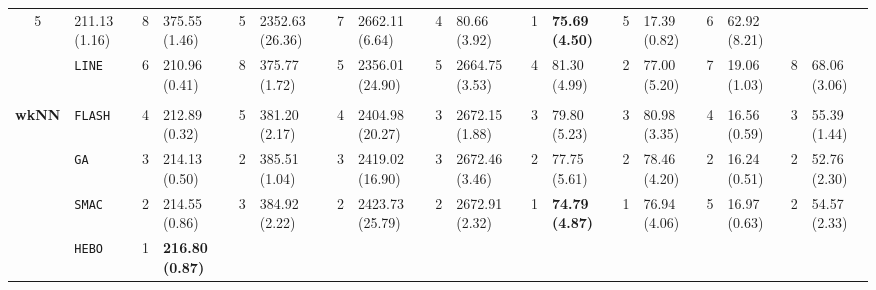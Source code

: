 \begin{tabular}{clllllllllllllllll}
  5 &
  \multicolumn{1}{l|}{211.13 (1.16)} &
  8 &
  \multicolumn{1}{l|}{375.55 (1.46)} &
  5 &
  \multicolumn{1}{l|}{2352.63 (26.36)} &
  7 &
  \multicolumn{1}{l|}{2662.11 (6.64)} &
  4 &
  \multicolumn{1}{l|}{80.66 (3.92)} &
  \cellcolor{blue!15}1 &
  \multicolumn{1}{l|}{\cellcolor{blue!15}\textbf{75.69 (4.50)}} &
  5 &
  \multicolumn{1}{l|}{17.39 (0.82)} &
  6 &
  62.92 (8.21) \\
\multicolumn{1}{c|}{} &
  \multicolumn{1}{l|}{\texttt{LINE}} &
  6 &
  \multicolumn{1}{l|}{210.96 (0.41)} &
  8 &
  \multicolumn{1}{l|}{375.77 (1.72)} &
  5 &
  \multicolumn{1}{l|}{2356.01 (24.90)} &
  5 &
  \multicolumn{1}{l|}{2664.75 (3.53)} &
  4 &
  \multicolumn{1}{l|}{81.30 (4.99)} &
  2 &
  \multicolumn{1}{l|}{77.00 (5.20)} &
  7 &
  \multicolumn{1}{l|}{19.06 (1.03)} &
  8 &
  68.06 (3.06) \\
\hline
\multicolumn{1}{l}{\textbf{}} &
    &
    &
    &
    &
    &
    &
    &
    &
    &
    &
    &
    &
    &
    &
    &
    &
    \\ \hline
\multicolumn{1}{c|}{\multirow{9}{*}{\textbf{wkNN}}} &
  \multicolumn{1}{l|}{\texttt{FLASH}} &
  4 &
  \multicolumn{1}{l|}{212.89 (0.32)} &
  5 &
  \multicolumn{1}{l|}{381.20 (2.17)} &
  4 &
  \multicolumn{1}{l|}{2404.98 (20.27)} &
  3 &
  \multicolumn{1}{l|}{2672.15 (1.88)} &
  3 &
  \multicolumn{1}{l|}{79.80 (5.23)} &
  3 &
  \multicolumn{1}{l|}{80.98 (3.35)} &
  4 &
  \multicolumn{1}{l|}{16.56 (0.59)} &
  3 &
  55.39 (1.44) \\
\multicolumn{1}{c|}{} &
  \multicolumn{1}{l|}{\texttt{GA}} &
  3 &
  \multicolumn{1}{l|}{214.13 (0.50)} &
  2 &
  \multicolumn{1}{l|}{385.51 (1.04)} &
  3 &
  \multicolumn{1}{l|}{2419.02 (16.90)} &
  3 &
  \multicolumn{1}{l|}{2672.46 (3.46)} &
  2 &
  \multicolumn{1}{l|}{77.75 (5.61)} &
  2 &
  \multicolumn{1}{l|}{78.46 (4.20)} &
  2 &
  \multicolumn{1}{l|}{16.24 (0.51)} &
  2 &
  52.76 (2.30) \\
\multicolumn{1}{c|}{} &
  \multicolumn{1}{l|}{\texttt{SMAC}} &
  2 &
  \multicolumn{1}{l|}{214.55 (0.86)} &
  3 &
  \multicolumn{1}{l|}{384.92 (2.22)} &
  2 &
  \multicolumn{1}{l|}{2423.73 (25.79)} &
  2 &
  \multicolumn{1}{l|}{2672.91 (2.32)} &
  \cellcolor{blue!15}1 &
  \multicolumn{1}{l|}{\cellcolor{blue!15}\textbf{74.79 (4.87)}} &
  \cellcolor{blue!15}1 &
  \multicolumn{1}{l|}{\cellcolor{blue!15}76.94 (4.06)} &
  5 &
  \multicolumn{1}{l|}{16.97 (0.63)} &
  2 &
  54.57 (2.33) \\
\multicolumn{1}{c|}{} &
  \multicolumn{1}{l|}{\texttt{HEBO}} &
  \cellcolor{blue!15}1 &
  \multicolumn{1}{l|}{\cellcolor{blue!15}\textbf{216.80 (0.87)}} &

\end{tabular}
